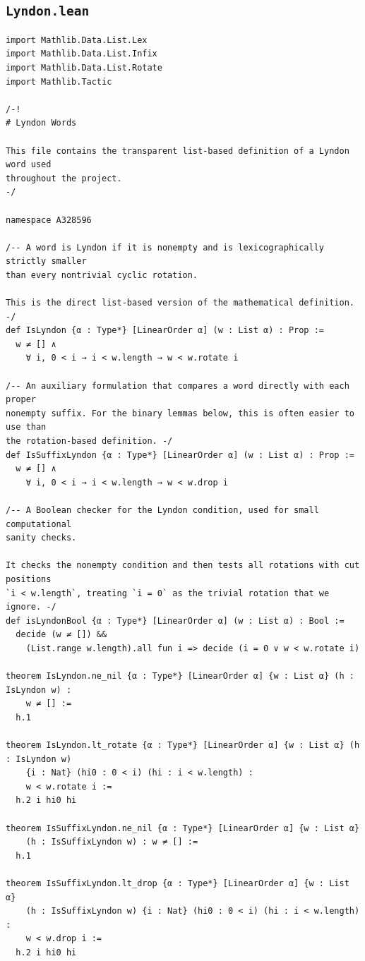 \documentclass[11pt]{article}
\theoremstyle{definition}
\theoremstyle{remark}
\begin{document}
\subsection{\texttt{Lyndon.lean}}
\begin{lstlisting}
import Mathlib.Data.List.Lex
import Mathlib.Data.List.Infix
import Mathlib.Data.List.Rotate
import Mathlib.Tactic

/-!
# Lyndon Words

This file contains the transparent list-based definition of a Lyndon word used
throughout the project.
-/

namespace A328596

/-- A word is Lyndon if it is nonempty and is lexicographically strictly smaller
than every nontrivial cyclic rotation.

This is the direct list-based version of the mathematical definition. -/
def IsLyndon {α : Type*} [LinearOrder α] (w : List α) : Prop :=
  w ≠ [] ∧
    ∀ i, 0 < i → i < w.length → w < w.rotate i

/-- An auxiliary formulation that compares a word directly with each proper
nonempty suffix. For the binary lemmas below, this is often easier to use than
the rotation-based definition. -/
def IsSuffixLyndon {α : Type*} [LinearOrder α] (w : List α) : Prop :=
  w ≠ [] ∧
    ∀ i, 0 < i → i < w.length → w < w.drop i

/-- A Boolean checker for the Lyndon condition, used for small computational
sanity checks.

It checks the nonempty condition and then tests all rotations with cut positions
`i < w.length`, treating `i = 0` as the trivial rotation that we ignore. -/
def isLyndonBool {α : Type*} [LinearOrder α] (w : List α) : Bool :=
  decide (w ≠ []) &&
    (List.range w.length).all fun i => decide (i = 0 ∨ w < w.rotate i)

theorem IsLyndon.ne_nil {α : Type*} [LinearOrder α] {w : List α} (h : IsLyndon w) :
    w ≠ [] :=
  h.1

theorem IsLyndon.lt_rotate {α : Type*} [LinearOrder α] {w : List α} (h : IsLyndon w)
    {i : Nat} (hi0 : 0 < i) (hi : i < w.length) :
    w < w.rotate i :=
  h.2 i hi0 hi

theorem IsSuffixLyndon.ne_nil {α : Type*} [LinearOrder α] {w : List α}
    (h : IsSuffixLyndon w) : w ≠ [] :=
  h.1

theorem IsSuffixLyndon.lt_drop {α : Type*} [LinearOrder α] {w : List α}
    (h : IsSuffixLyndon w) {i : Nat} (hi0 : 0 < i) (hi : i < w.length) :
    w < w.drop i :=
  h.2 i hi0 hi


\end{lstlisting}
\end{document}
